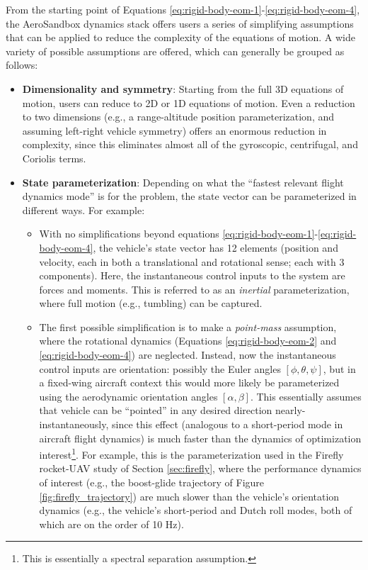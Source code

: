 From the starting point of Equations \ref{eq:rigid-body-eom-1}-\ref{eq:rigid-body-eom-4}, the AeroSandbox dynamics stack offers users a series of simplifying assumptions that can be applied to reduce the complexity of the equations of motion. A wide variety of possible assumptions are offered, which can generally be grouped as follows:
\begin{itemize}
    \item \textbf{Dimensionality and symmetry}: Starting from the full 3D equations of motion, users can reduce to 2D or 1D equations of motion. Even a reduction to two dimensions (e.g., a range-altitude position parameterization, and assuming left-right vehicle symmetry) offers an enormous reduction in complexity, since this eliminates almost all of the gyroscopic, centrifugal, and Coriolis terms.
    \item \textbf{State parameterization}: Depending on what the ``fastest relevant flight dynamics mode'' is for the problem, the state vector can be parameterized in different ways. For example:
    \begin{itemize}
        \item With no simplifications beyond equations \ref{eq:rigid-body-eom-1}-\ref{eq:rigid-body-eom-4}, the vehicle's state vector has 12 elements (position and velocity, each in both a translational and rotational sense; each with 3 components). Here, the instantaneous control inputs to the system are forces and moments. This is referred to as an \emph{inertial} parameterization, where full motion (e.g., tumbling) can be captured.
        \item The first possible simplification is to make a \emph{point-mass} assumption, where the rotational dynamics (Equations \ref{eq:rigid-body-eom-2} and \ref{eq:rigid-body-eom-4}) are neglected. Instead, now the instantaneous control inputs are orientation: possibly the Euler angles $[\phi, \theta, \psi]$, but in a fixed-wing aircraft context this would more likely be parameterized using the aerodynamic orientation angles $[\alpha, \beta]$. This essentially assumes that vehicle can be ``pointed'' in any desired direction nearly-instantaneously, since this effect (analogous to a short-period mode in aircraft flight dynamics) is much faster than the dynamics of optimization interest\footnote{This is essentially a spectral separation assumption.}. For example, this is the parameterization used in the Firefly rocket-UAV study of Section \ref{sec:firefly}, where the performance dynamics of interest (e.g., the boost-glide trajectory of Figure \ref{fig:firefly_trajectory}) are much slower than the vehicle's orientation dynamics (e.g., the vehicle's short-period and Dutch roll modes, both of which are on the order of 10 Hz).

\end{itemize}
\end{itemize}
